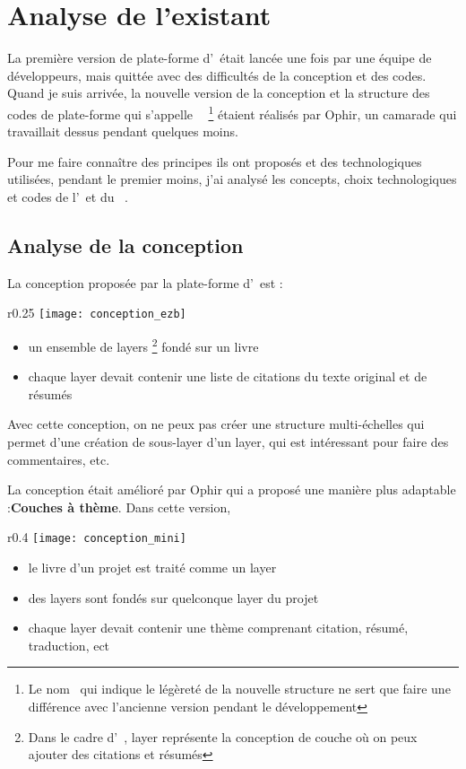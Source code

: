 \section{Analyse de l'existant}

La première version de plate-forme d’\ezb\ était lancée une fois par une équipe de développeurs, mais quittée avec des difficultés de la conception et des codes. Quand je suis arrivée, la nouvelle version de la conception et la structure des codes de plate-forme qui s'appelle \textbf{\mini\ } \footnote{Le nom \mini\ qui indique le légèreté de la nouvelle structure ne sert que faire une différence avec l'ancienne version pendant le développement} étaient réalisés par Ophir, un camarade qui travaillait dessus pendant quelques moins. 

Pour me faire connaître des principes ils ont proposés et des technologiques utilisées, pendant le premier moins, j’ai analysé les concepts, choix technologiques et codes de l'\ezb\ et du \mini\ .  

\subsection{Analyse de la conception}
La conception proposée par la plate-forme d’\ezb\ est :
\begin{wrapfigure}{r}{0.25\textwidth}
    \centering
    \texttt{[image: conception\_ezb]}
\end{wrapfigure}
\begin{itemize}
    \item un ensemble de layers \footnote{Dans le cadre d'\ezb\ , layer représente la conception de couche où on peux ajouter des citations et résumés} fondé sur un livre
    \item chaque layer devait contenir une liste de citations du texte original et de résumés
\end{itemize}
Avec cette conception, on ne peux pas créer une structure multi-échelles qui permet d'une création de sous-layer d'un layer, qui est intéressant pour faire des commentaires, etc.

La conception était amélioré par Ophir qui a proposé une manière plus adaptable :\textbf{Couches à thème}. Dans cette version, 
\begin{wrapfigure}{r}{0.4\textwidth}
    \centering
    \texttt{[image: conception\_mini]}
\end{wrapfigure}
\begin{itemize}
    \item le livre d'un projet est traité comme un layer
    \item des layers sont fondés sur quelconque layer du projet
    \item chaque layer devait contenir une thème comprenant citation, résumé, traduction, ect
\end{itemize}

